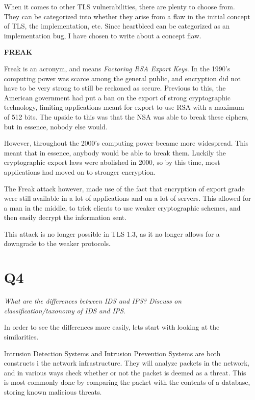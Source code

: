 \documentclass{article}
\begin{document}
When it comes to other TLS vulnerabilities, there are plenty to choose from. They can be categorized into whether they arise from a flaw in the initial concept of TLS, the implementation, etc. Since heartbleed can be categorized as an implementation bug, I have chosen to write about a concept flaw.

\textbf{FREAK}

Freak is an acronym, and means \textit{Factoring RSA Export Keys}. In the 1990's computing power was scarce among the general public, and encryption did not have to be very strong to still be reckoned as secure. Previous to this, the American government had put a ban on the export of strong cryptographic technology, limiting applications meant for export to use RSA with a maximum of 512 bits. The upside to this was that the NSA was able to break these ciphers, but in essence, nobody else would.

However, throughout the 2000's computing power became more widespread. This meant that in essence, anybody would be able to break them. Luckily the cryptographic export laws were abolished in 2000, so by this time, most applications had moved on to stronger encryption.

The Freak attack however, made use of the fact that encryption of export grade were still available in a lot of applications and on a lot of servers. This allowed for a man in the middle, to trick clients to use weaker cryptographic schemes, and then easily decrypt the information sent.

This attack is no longer possible in TLS 1.3, as it no longer allows for a downgrade to the weaker protocols.

\newpage
\section{Q4}
\begin{tcolorbox}
  \textit{What are the differences between IDS and IPS? Discuss on classification/taxonomy of IDS and IPS.}
\end{tcolorbox}
In order to see the differences more easily, lets start with looking at the similarities.

Intrusion Detection Systems and Intrusion Prevention Systems are both constructs i the network infrastructure. They will analyze packets in the network, and in various ways check whether or not the packet is deemed as a threat. This is most commonly done by comparing the packet with the contents of a database, storing known malicious threats.
\end{document}
